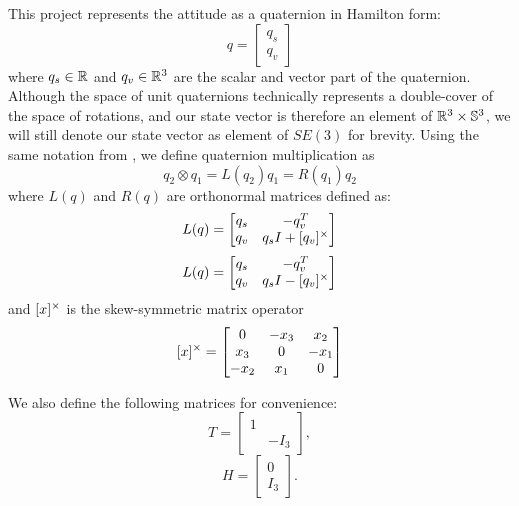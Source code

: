 \documentclass[conference]{IEEEtran}
\begin{document}
This project represents the attitude as a quaternion in Hamilton form: 
\begin{equation}
    q = \begin{bmatrix}
        q_s \\ q_v
    \end{bmatrix}
\end{equation}
where $q_s \in \mathbb{R}$ and $q_v \in \mathbb{R}^3$ are the scalar and vector part of the quaternion. 
Although the space of unit quaternions technically represents a double-cover of the space 
of rotations, and our state vector is therefore an element of $\mathbb{R}^3 \times \mathbb{S}^3$,
we will still denote our state vector as element of $SE(3)$ for brevity.
Using the same notation from \cite{jackson_Planning_2021}, we define quaternion 
multiplication as 
\begin{equation}
    q_2 \otimes q_1 = L(q_2) q_1 = R(q_1) q_2
\end{equation}
where $L(q)$ and $R(q)$ are orthonormal matrices defined as:
\begin{equation}
    L(q) = \begin{bmatrix}
        q_s & -q_v^T \\
        q_v & q_s I + [q_v]^\times
    \end{bmatrix}
\end{equation}
\begin{equation}
    L(q) = \begin{bmatrix}
        q_s & -q_v^T \\
        q_v & q_s I - [q_v]^\times
    \end{bmatrix}
\end{equation}
and $[x]^\times$ is the skew-symmetric matrix operator
\begin{equation}
    [x]^\times = \begin{bmatrix}
        0   & -x_3 &  x_2 \\
        x_3 & 0    & -x_1 \\
       -x_2 & x_1  &  0
    \end{bmatrix}
\end{equation}

We also define the following matrices for convenience:
\begin{equation}
    T = \begin{bmatrix}
        1 & \\ & -I_3
    \end{bmatrix},
\end{equation}
\begin{equation}
    H = \begin{bmatrix}
        0 \\ I_3
    \end{bmatrix}.
\end{equation}
\end{document}
